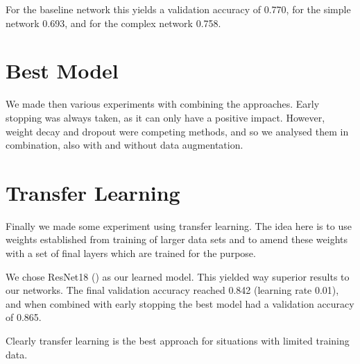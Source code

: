 \documentclass[sigconf,nonacm]{acmart}
\begin{document}
For the baseline network this yields a validation accuracy
of 0.770, for the simple network 0.693, and for the
complex network 0.758.

\section{Best Model}

We made then various experiments with combining the
approaches.
Early stopping was always taken, as it can only have
a positive impact.
However, weight decay and dropout were competing
methods, and so we analysed them in combination,
also with and without data augmentation.

\section{Transfer Learning}

Finally we made some experiment using transfer
learning.
The idea here is to use weights established from training
of larger data sets and to amend these weights with
a set of final layers which are trained for the purpose.

We chose ResNet18 (\cite{resnet2015}) as our learned
model.
This yielded way superior results to our networks.
The final validation accuracy reached 0.842 (learning
rate 0.01), and when combined with early stopping the best
model had a validation accuracy of 0.865.

Clearly transfer learning is the best approach for
situations with limited training data.



\end{document}
